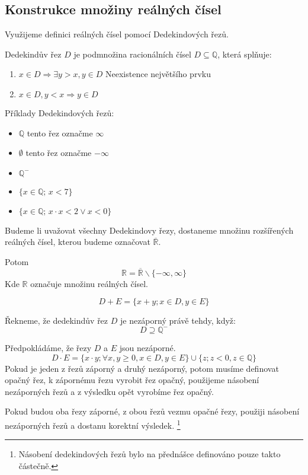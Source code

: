 \subsection{Konstrukce množiny reálných čísel}
Využijeme definici reálných čísel pomocí Dedekindových řezů.

\begin{definition}
    Dedekindův řez $D$ je podmnožina racionálních čísel $D \subseteq \mathbb{Q}$, která splňuje:
    \begin{enumerate}
        \item $x \in D \Rightarrow \exists y > x, y \in D$ \hfill Neexistence největšího prvku
        \item $x \in D, y < x \Rightarrow y \in D$ \hfill
    \end{enumerate}
\end{definition}

Příklady Dedekindových řezů:
\begin{itemize}
    \item $\mathbb{Q}$ tento řez označme $\infty$
    \item $\emptyset$ tento řez označme $- \infty$
    \item $\mathbb{Q}^{-}$
    \item $\{x \in \mathbb{Q};\,x < 7\}$
    \item $\{x \in \mathbb{Q};\, x \cdot x < 2 \vee x < 0\}$
\end{itemize}

Budeme li uvažovat všechny Dedekindovy řezy, dostaneme množinu rozšířených reálných
čísel, kterou budeme označovat $\overline{\mathbb{R}}$.

Potom $$\mathbb{R} = \overline{\mathbb{R}} \smallsetminus \{-\infty, \infty\}$$
Kde $\mathbb{R}$ označuje množinu reálných čísel.

\begin{definition}
    $$D + E = \{x + y; x\in D, y \in E\}$$
\end{definition}

\begin{definition}
    Řekneme, že dedekindův řez $D$ je nezáporný právě tehdy, když:
    $$D \supseteq \mathbb{Q}^{-}$$
\end{definition}

\begin{definition}
    Předpokládáme, že řezy $D$ a $E$ jsou nezáporné.
    $$D \cdot E = \{x \cdot y; \forall x, y \geq 0, x \in D, y \in E\} \cup \{z; z < 0, z \in \mathbb{Q}\}$$
    Pokud je jeden z řezů záporný a druhý nezáporný, potom musíme definovat opačný řez,
    k zápornému řezu vyrobit řez opačný, použijeme násobení nezáporných řezů a z výsledku opět vyrobíme
    řez opačný.

    Pokud budou oba řezy záporné, z obou řezů vezmu opačné řezy, použiji násobení nezáporných řezů
    a dostanu korektní výsledek. \footnote{Násobení dedekindových řezů bylo na přednášce definováno
    pouze takto částečně.}
\end{definition}

